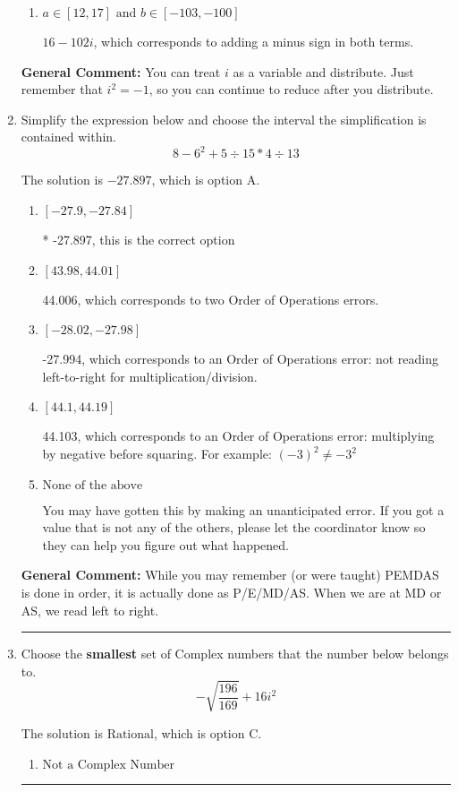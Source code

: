 \documentclass{extbook}[14pt]
\newcommand{\litem}[1]{\item #1

\rule{\textwidth}{0.4pt}}
\begin{document}
\begin{enumerate}
{\begin{enumerate}[label=\Alph*.]
 $-96 + 38 i$, which corresponds to adding a minus sign in the first term.
\item \( a \in [12, 17] \text{ and } b \in [-103, -100] \)

 $16 - 102 i$, which corresponds to adding a minus sign in both terms.
\end{enumerate}

\textbf{General Comment:} You can treat $i$ as a variable and distribute. Just remember that $i^2=-1$, so you can continue to reduce after you distribute.
}
\litem{
Simplify the expression below and choose the interval the simplification is contained within.
\[ 8 - 6^2 + 5 \div 15 * 4 \div 13 \]

The solution is \( -27.897 \), which is option A.\begin{enumerate}[label=\Alph*.]
\item \( [-27.9, -27.84] \)

* -27.897, this is the correct option
\item \( [43.98, 44.01] \)

 44.006, which corresponds to two Order of Operations errors.
\item \( [-28.02, -27.98] \)

 -27.994, which corresponds to an Order of Operations error: not reading left-to-right for multiplication/division.
\item \( [44.1, 44.19] \)

 44.103, which corresponds to an Order of Operations error: multiplying by negative before squaring. For example: $(-3)^2 \neq -3^2$
\item \( \text{None of the above} \)

 You may have gotten this by making an unanticipated error. If you got a value that is not any of the others, please let the coordinator know so they can help you figure out what happened.
\end{enumerate}

\textbf{General Comment:} While you may remember (or were taught) PEMDAS is done in order, it is actually done as P/E/MD/AS. When we are at MD or AS, we read left to right.
}
\litem{
Choose the \textbf{smallest} set of Complex numbers that the number below belongs to.
\[ -\sqrt{\frac{196}{169}} + 16i^2 \]

The solution is \( \text{Rational} \), which is option C.\begin{enumerate}[label=\Alph*.]
\item \( \text{Not a Complex Number} \)


\end{enumerate}}
\end{enumerate}
\end{document}
